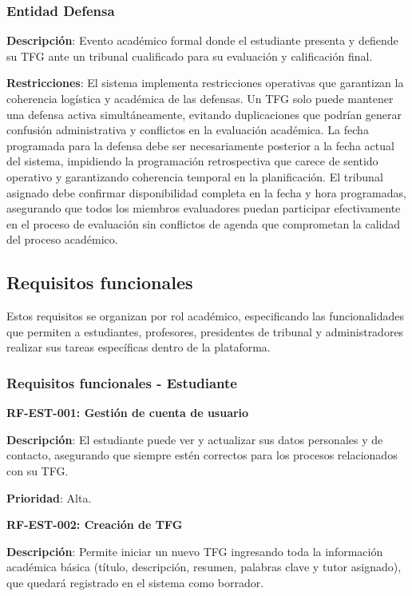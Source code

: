 \documentclass[12pt,a4paper,oneside]{report}
\begin{document}
\subsubsection{Entidad Defensa}\label{entidad-defensa}

\textbf{Descripción}: Evento académico formal donde el estudiante presenta y defiende su TFG ante un tribunal cualificado para su evaluación y calificación final.

\textbf{Restricciones}: El sistema implementa restricciones operativas que garantizan la coherencia logística y académica de las defensas. Un TFG solo puede mantener una defensa activa simultáneamente, evitando duplicaciones que podrían generar confusión administrativa y conflictos en la evaluación académica. La fecha programada para la defensa debe ser necesariamente posterior a la fecha actual del sistema, impidiendo la programación retrospectiva que carece de sentido operativo y garantizando coherencia temporal en la planificación. El tribunal asignado debe confirmar disponibilidad completa en la fecha y hora programadas, asegurando que todos los miembros evaluadores puedan participar efectivamente en el proceso de evaluación sin conflictos de agenda que comprometan la calidad del proceso académico.

\subsection{Requisitos funcionales}\label{requisitos-funcionales}

Estos requisitos se organizan por rol académico, especificando las funcionalidades que permiten a estudiantes, profesores, presidentes de tribunal y administradores realizar sus tareas específicas dentro de la plataforma.

\subsubsection{Requisitos funcionales -
Estudiante}\label{requisitos-funcionales---estudiante}

\textbf{RF-EST-001: Gestión de cuenta de usuario}

\textbf{Descripción}: El estudiante puede ver y actualizar sus datos personales y de contacto, asegurando que siempre estén correctos para los procesos relacionados con su TFG.

\textbf{Prioridad}: Alta.

\textbf{RF-EST-002: Creación de TFG}

\textbf{Descripción}: Permite iniciar un nuevo TFG ingresando toda la información académica básica (título, descripción, resumen, palabras clave y tutor asignado), que quedará registrado en el sistema como borrador.
\end{document}

